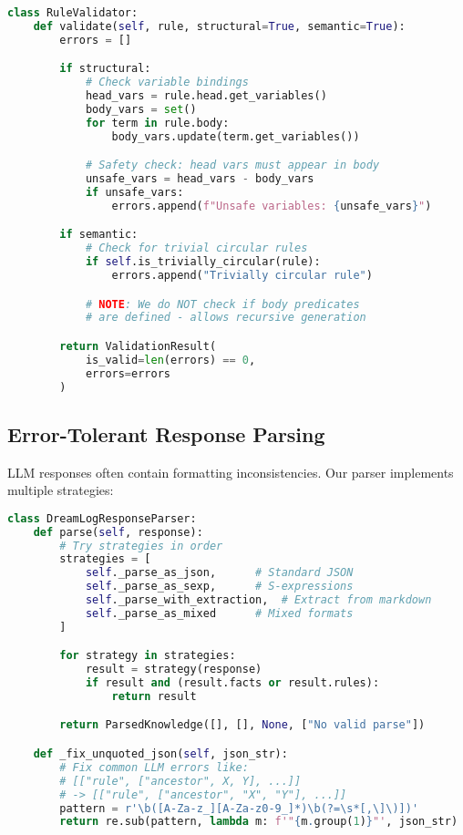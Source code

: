 \documentclass[10pt,conference]{IEEEtran}
\begin{document}
\begin{lstlisting}[language=Python]
class RuleValidator:
    def validate(self, rule, structural=True, semantic=True):
        errors = []

        if structural:
            # Check variable bindings
            head_vars = rule.head.get_variables()
            body_vars = set()
            for term in rule.body:
                body_vars.update(term.get_variables())

            # Safety check: head vars must appear in body
            unsafe_vars = head_vars - body_vars
            if unsafe_vars:
                errors.append(f"Unsafe variables: {unsafe_vars}")

        if semantic:
            # Check for trivial circular rules
            if self.is_trivially_circular(rule):
                errors.append("Trivially circular rule")

            # NOTE: We do NOT check if body predicates
            # are defined - allows recursive generation

        return ValidationResult(
            is_valid=len(errors) == 0,
            errors=errors
        )
\end{lstlisting}

\subsection{Error-Tolerant Response Parsing}

LLM responses often contain formatting inconsistencies. Our parser implements multiple strategies:

\begin{lstlisting}[language=Python]
class DreamLogResponseParser:
    def parse(self, response):
        # Try strategies in order
        strategies = [
            self._parse_as_json,      # Standard JSON
            self._parse_as_sexp,      # S-expressions
            self._parse_with_extraction,  # Extract from markdown
            self._parse_as_mixed      # Mixed formats
        ]

        for strategy in strategies:
            result = strategy(response)
            if result and (result.facts or result.rules):
                return result

        return ParsedKnowledge([], [], None, ["No valid parse"])

    def _fix_unquoted_json(self, json_str):
        # Fix common LLM errors like:
        # [["rule", ["ancestor", X, Y], ...]]
        # -> [["rule", ["ancestor", "X", "Y"], ...]]
        pattern = r'\b([A-Za-z_][A-Za-z0-9_]*)\b(?=\s*[,\]\)])'
        return re.sub(pattern, lambda m: f'"{m.group(1)}"', json_str)
\end{lstlisting}
\end{document}
